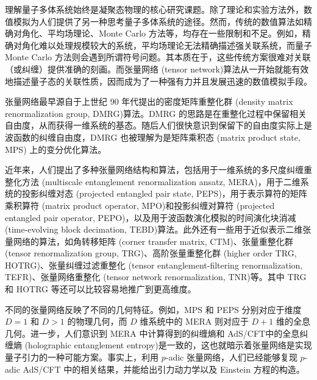 理解量子多体系统始终是凝聚态物理的核心研究课题。除了理论和实验方法外，数值模拟为人们提供了另一种思考量子多体系统的途径。然而，传统的数值算法如精确对角化、平均场理论、Monte Carlo 方法等，均存在一些限制和不足。例如，精确对角化难以处理规模较大的系统，平均场理论无法精确描述强关联系统，而量子 Monte Carlo 方法则会遇到所谓符号问题。其本质在于，这些传统方案很难对关联（或纠缠）提供准确的刻画。而张量网络 (tensor network)\cite{orus2014practical,bridgeman2017hand,biamonte2017tensor,orus2019tensor,ran2020tensor,evenbly2022practical}算法从一开始就能有效地描述量子态的关联性质，因而成为了一种强有力并且发展迅速的数值模拟手段。

张量网络最早源自于上世纪 90 年代提出的密度矩阵重整化群 (density matrix renormalization group, DMRG)\cite{white1992density,white1993density,schollwock2005density}算法。DMRG 的思路是在重整化过程中保留相关自由度，从而获得一维系统的基态。随后人们很快意识到保留下的自由度实际上是波函数的纠缠自由度，DMRG 也被理解为是矩阵乘积态 (matrix product state, MPS) 上的变分优化算法\cite{mcculloch2007density,perez2007matrix,verstraete2008matrix,schollwock2011density}。

近年来，人们提出了多种张量网络结构和算法，包括用于一维系统的多尺度纠缠重整化方法 (multiscale entanglement renormalization ansatz, MERA)\cite{vidal2007entanglement,evenbly2009algorithms,evenbly2014algorithms}，用于二维系统的投影纠缠对态 (projected entangled pair state, PEPS)\cite{verstraete2004renormalization}，用于表示算符的矩阵乘积算符 (matrix product operator, MPO)\cite{pirvu2010matrix}和投影纠缠对算符 (projected entangled pair operator, PEPO)\cite{czarnik2015variational}，以及用于波函数演化模拟的时间演化块消减 (time-evolving block decimation, TEBD)\cite{vidal2003efficient,vidal2004efficient,vidal2007classical,orus2008infinite}算法。此外还有一些用于近似表示二维张量网络的算法，如角转移矩阵 (corner transfer matrix, CTM)\cite{nishino1996corner,orus2012exploring}、张量重整化群 (tensor renormalization group, TRG)\cite{levin2007tensor}、高阶张量重整化群 (higher order TRG, HOTRG)\cite{xie2012coarse}、张量纠缠过滤重整化 (tensor entanglement-filtering renormalization, TEFR)\cite{gu2009tensor1}、张量网络重整化 (tensor network renormalization, TNR)\cite{evenbly2015tensor1,evenbly2017algorithms}\allowbreak 等。其中 TRG 和 HOTRG 等还可以比较容易地推广到更高维度。

不同的张量网络反映了不同的几何特征。例如，MPS 和 PEPS 分别对应于维度 $D=1$ 和 $D>1$ 的物理几何，而 $D$ 维系统中的 MERA 则对应于 $D+1$ 维的全息几何\cite{evenbly2011tensor}。进一步，人们意识到 MERA 中计算得到的纠缠熵和 AdS/CFT\cite{maldacena1999large}中的全息纠缠熵 (holographic entanglement entropy)\cite{ryu2006holographic}是一致的\cite{swingle2012entanglement,swingle2012constructing}，这也就暗示着张量网络是实现量子引力的一种可能方案。事实上，利用 $p$-adic 张量网络，人们已经能够复现 $p$-adic AdS/CFT 中的相关结果\cite{bhattacharyya2018tensor,hung2019padic}，并能给出引力动力学以及 Einstein 方程的构造\cite{chen2021emergent}。

